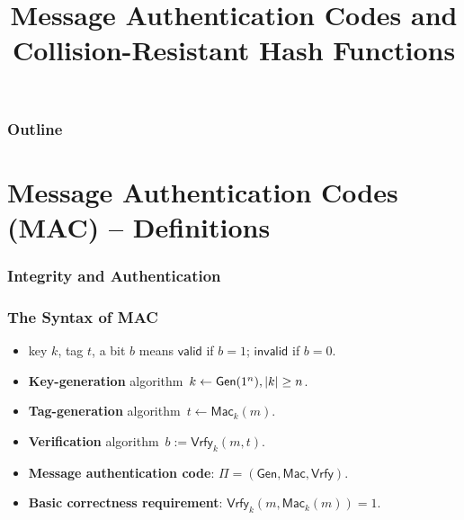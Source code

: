 

\title{Message Authentication Codes and Collision-Resistant Hash Functions}


\maketitle
\begin{frame}
\frametitle{Outline}
\tableofcontents
\end{frame}
\section{Message Authentication Codes (MAC) -- Definitions}
\begin{frame}\frametitle{Integrity and Authentication}
\begin{figure}
\begin{center}


\end{center}
\end{figure}
\end{frame}
\begin{frame}\frametitle{The Syntax of MAC}
\begin{figure}
\begin{center}

\end{center}
\end{figure}
\begin{itemize}
\item key $k$, tag $t$, a bit $b$ means $\mathsf{valid}$ if $b=1$; $\mathsf{invalid}$ if $b=0$.
\item \textbf{Key-generation} algorithm~$k \gets \mathsf{Gen}(1^n), \lvert k\rvert \ge n$.
\item \textbf{Tag-generation} algorithm~$t \gets \mathsf{Mac}_k(m)$.
\item \textbf{Verification} algorithm~$b:= \mathsf{Vrfy}_k(m,t)$.
\item \textbf{Message authentication code}: $\Pi = (\mathsf{Gen}, \mathsf{Mac}, \mathsf{Vrfy})$.
\item \textbf{Basic correctness requirement}: $\mathsf{Vrfy}_k(m,\mathsf{Mac}_k(m)) = 1$.
\end{itemize}
\end{frame}
